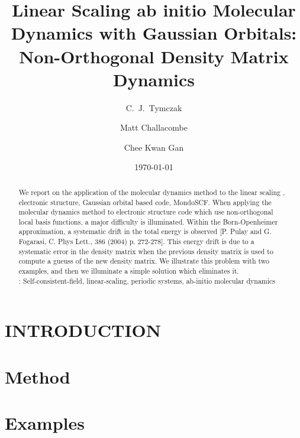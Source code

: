\commentoutA{\documentclass[prb,aps,nobibnotes,twocolumn,doublespace,twocolumngrid,superbib,showpacs]{revtex4}}
\begin{document}
\date{\today}

\title{Linear Scaling ab initio Molecular Dynamics with Gaussian Orbitals:
Non-Orthogonal Density Matrix Dynamics }

\author{C.~J.~Tymczak}
\author{Matt Challacombe}

\author{Chee Kwan Gan}
\affiliation{}


\begin{abstract}
We report on the application of the molecular dynamics method to the linear scaling , electronic structure, 
Gaussian orbital based code, MondoSCF.  When applying the molecular dynamics method to electronic structure 
code which use non-orthogonal local basis functions, a major difficulty is illuminated. Within the  
Born-Openheimer approximation, a systematic drift in the total energy is observed [P. Pulay and G. Fogarasi, 
C. Phys Lett., 386 (2004) p. 272-278]. This energy drift is due to a systematic error in the density matrix 
when the previous density matrix is used to compute a gueuss of the new density matrix. We illustrate this 
problem with two examples, and then we illuminate a simple solution which eliminates it.
\\ \smallskip
{}: Self-consistent-field, linear-scaling, periodic systems, ab-initio molecular dynamics 

%
\end{abstract}

\pacs{}

\maketitle


\section{INTRODUCTION}

\section{Method}

\section{Examples}
\end{document}
